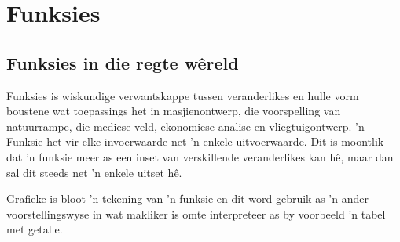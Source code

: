 \chapter{Funksies}
\setcounter{figure}{0}
\setcounter{subfigure}{0}

\section{Funksies in die regte w\^ereld}
Funksies is wiskundige verwantskappe tussen veranderlikes en hulle vorm boustene wat toepassings het in masjienontwerp, die voorspelling van natuurrampe, die mediese veld,
ekonomiese analise en vliegtuigontwerp. ’n Funksie het vir elke invoerwaarde net ’n enkele uitvoerwaarde. Dit is moontlik dat ’n funksie meer as een inset van verskillende veranderlikes kan hê, maar dan sal dit steeds net ’n enkele uitset hê. 
\par 

Grafieke is bloot ’n tekening van ’n funksie en dit word gebruik as ’n ander voorstellingswyse in wat makliker is omte interpreteer as by voorbeeld ’n tabel met getalle.\par 


